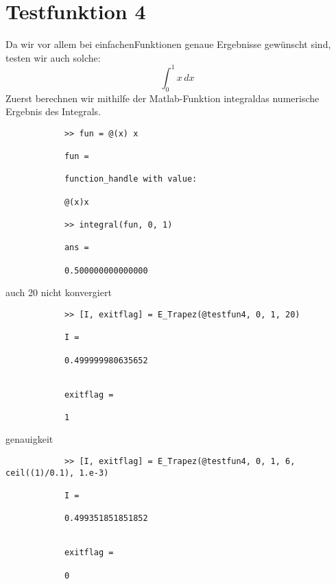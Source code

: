 \documentclass[11pt,titlepage]{article}
\begin{document}
	\section{Testfunktion 4}
		Da wir vor allem bei \glqq einfachen\grqq  Funktionen genaue Ergebnisse gewünscht sind, testen wir auch solche:
		\begin{displaymath}
			\int_{0}^1 x \, dx\
		\end{displaymath}
		Zuerst berechnen wir mithilfe der Matlab-Funktion \glqq integral\grqq  das numerische Ergebnis des Integrals.
		\begin{lstlisting}
			>> fun = @(x) x
			
			fun =
			
			function_handle with value:
			
			@(x)x
			
			>> integral(fun, 0, 1)
			
			ans =
			
			0.500000000000000
		\end{lstlisting}
	auch 20 nicht konvergiert
		\begin{lstlisting}
			>> [I, exitflag] = E_Trapez(@testfun4, 0, 1, 20)
			
			I =
			
			0.499999980635652
			
			
			exitflag =
			
			1
		\end{lstlisting}
		genauigkeit
		\begin{lstlisting}
			>> [I, exitflag] = E_Trapez(@testfun4, 0, 1, 6, ceil((1)/0.1), 1.e-3)
			
			I =
			
			0.499351851851852
			
			
			exitflag =
			
			0
		\end{lstlisting}
\end{document}
